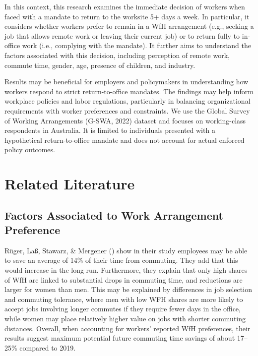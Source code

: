 \documentclass[
  a4paper,
]{article}
\numberwithin{equation}{section}
\numberwithin{figure}{section}
\numberwithin{table}{section}
\begin{document}
In this context, this research examines the immediate decision of workers when faced with a mandate to return to the worksite 5+ days a week. In particular, it considers whether workers prefer to remain in a WfH arrangement (e.g., seeking a job that allows remote work or leaving their current job) or to return fully to in-office work (i.e., complying with the mandate). It further aims to understand the factors associated with this decision, including perception of remote work, commute time, gender, age, presence of children, and industry.

Results may be beneficial for employers and policymakers in understanding how workers respond to strict return-to-office mandates. The findings may help inform workplace policies and labor regulations, particularly in balancing organizational requirements with worker preferences and constraints. We use the Global Survey of Working Arrangements (G-SWA, 2022) dataset and focuses on working-class respondents in Australia. It is limited to individuals presented with a hypothetical return-to-office mandate and does not account for actual enforced policy outcomes.

\section{Related Literature}\label{related-literature}

\subsection{Factors Associated to Work Arrangement Preference}\label{factors-associated-to-work-arrangement-preference}

Rüger, Laß, Stawarz, \& Mergener () show in their study employees may be able to save an average of 14\% of their time from commuting. They add that this would increase in the long run. Furthermore, they explain that only high shares of WfH are linked to substantial drops in commuting time, and reductions are larger for women than men. This may be explained by differences in job selection and commuting tolerance, where men with low WFH shares are more likely to accept jobs involving longer commutes if they require fewer days in the office, while women may place relatively higher value on jobs with shorter commuting distances. Overall, when accounting for workers' reported WfH preferences, their results suggest maximum potential future commuting time savings of about 17--25\% compared to 2019.
\end{document}
